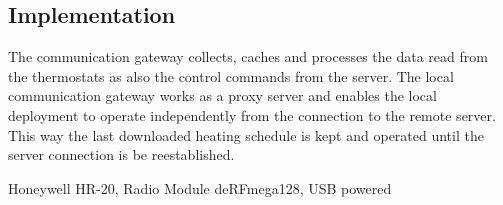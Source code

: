 \subsection{Implementation}

The communication gateway collects, caches and processes the data read from the thermostats as also the control commands from the server. The local communication gateway works as a proxy server and enables the local deployment to operate independently from the connection to the remote server. This way the last downloaded heating schedule is kept and operated until the server connection is be reestablished.

Honeywell HR-20, Radio Module deRFmega128, USB powered

